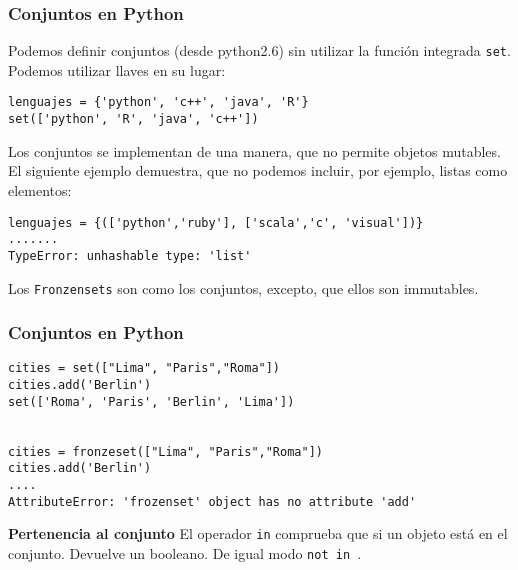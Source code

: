 \documentclass[10pt]{beamer}
\begin{document}
\begin{frame}[fragile]
\frametitle{Conjuntos en Python}
Podemos definir conjuntos (desde python2.6) sin utilizar la funci\'on integrada \texttt{set}. Podemos utilizar llaves en su lugar:

\vspace{0.2cm}

\begin{lstlisting}
lenguajes = {'python', 'c++', 'java', 'R'}
set(['python', 'R', 'java', 'c++'])
\end{lstlisting}


Los conjuntos se implementan de una manera, que no permite  objetos mutables. El siguiente ejemplo demuestra, que no podemos incluir, por ejemplo, listas como elementos:

\vspace{0.2cm}


\begin{lstlisting}
lenguajes = {(['python','ruby'], ['scala','c', 'visual'])}
.......
TypeError: unhashable type: 'list'
\end{lstlisting}

\vspace{0.2cm}

Los \texttt{Fronzensets} son como los conjuntos, excepto, que ellos son immutables.
\end{frame}

\begin{frame}[fragile]
\frametitle{Conjuntos en Python}
\begin{lstlisting}
cities = set(["Lima", "Paris","Roma"])
cities.add('Berlin')  
set(['Roma', 'Paris', 'Berlin', 'Lima'])


cities = fronzeset(["Lima", "Paris","Roma"])
cities.add('Berlin') 
....
AttributeError: 'frozenset' object has no attribute 'add'
\end{lstlisting}

\vspace{0.2cm}

\textbf{Pertenencia al conjunto} El operador \texttt{in} comprueba que si un objeto est\'a en el conjunto. Devuelve un booleano. De igual modo \texttt{not in }.
\end{frame} 
\end{document}
